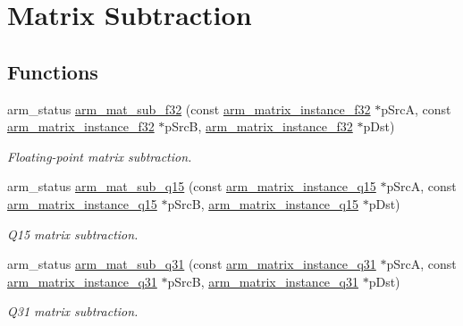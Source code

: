 \hypertarget{group___matrix_sub}{\section{Matrix Subtraction}
\label{group___matrix_sub}
}
\subsection*{Functions}
\begin{DoxyCompactItemize}
\item 
arm\-\_\-status \hyperlink{group___matrix_sub_gac8b72fb70246ccfee3b372002345732c}{arm\-\_\-mat\-\_\-sub\-\_\-f32} (const \hyperlink{structarm__matrix__instance__f32}{arm\-\_\-matrix\-\_\-instance\-\_\-f32} $\ast$p\-Src\-A, const \hyperlink{structarm__matrix__instance__f32}{arm\-\_\-matrix\-\_\-instance\-\_\-f32} $\ast$p\-Src\-B, \hyperlink{structarm__matrix__instance__f32}{arm\-\_\-matrix\-\_\-instance\-\_\-f32} $\ast$p\-Dst)
\begin{DoxyCompactList}\small\item\em Floating-\/point matrix subtraction. \end{DoxyCompactList}\item 
arm\-\_\-status \hyperlink{group___matrix_sub_gaf647776a425b7f9dd0aca3e11d81f02f}{arm\-\_\-mat\-\_\-sub\-\_\-q15} (const \hyperlink{structarm__matrix__instance__q15}{arm\-\_\-matrix\-\_\-instance\-\_\-q15} $\ast$p\-Src\-A, const \hyperlink{structarm__matrix__instance__q15}{arm\-\_\-matrix\-\_\-instance\-\_\-q15} $\ast$p\-Src\-B, \hyperlink{structarm__matrix__instance__q15}{arm\-\_\-matrix\-\_\-instance\-\_\-q15} $\ast$p\-Dst)
\begin{DoxyCompactList}\small\item\em Q15 matrix subtraction. \end{DoxyCompactList}\item 
arm\-\_\-status \hyperlink{group___matrix_sub_ga39f42e0e3b7f115fbb909d6ff4e1329d}{arm\-\_\-mat\-\_\-sub\-\_\-q31} (const \hyperlink{structarm__matrix__instance__q31}{arm\-\_\-matrix\-\_\-instance\-\_\-q31} $\ast$p\-Src\-A, const \hyperlink{structarm__matrix__instance__q31}{arm\-\_\-matrix\-\_\-instance\-\_\-q31} $\ast$p\-Src\-B, \hyperlink{structarm__matrix__instance__q31}{arm\-\_\-matrix\-\_\-instance\-\_\-q31} $\ast$p\-Dst)
\begin{DoxyCompactList}\small\item\em Q31 matrix subtraction. \end{DoxyCompactList}\end{DoxyCompactItemize}


